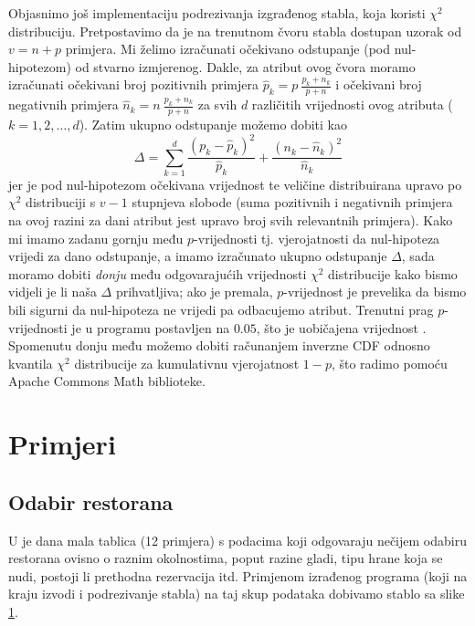 \documentclass[12pt,a4paper]{article}
\begin{document}
Objasnimo još implementaciju podrezivanja izgrađenog stabla, koja koristi $\chi^2$ distribuciju. Pretpostavimo da je na trenutnom
čvoru stabla dostupan uzorak od $v=n+p$ primjera. Mi želimo izračunati očekivano odstupanje (pod nul-hipotezom) od 
stvarno izmjerenog. Dakle, za atribut ovog čvora moramo izračunati očekivani broj pozitivnih primjera $\hat{p}_k=p\ \frac{p_k+n_k}{p+n}$
 i očekivani broj negativnih primjera $\hat{n}_k=n\ \frac{p_k+n_k}{p+n}$ za svih $d$ različitih vrijednosti ovog atributa ($k=1,2,\ldots,d$).
 Zatim ukupno odstupanje možemo dobiti kao
 \begin{equation*}
    \Delta=\sum^d_{k=1}\frac{(p_k-\hat{p}_k)^2}{\hat{p}_k}+\frac{(n_k-\hat{n}_k)^2}{\hat{n}_k}
 \end{equation*}
jer je pod nul-hipotezom očekivana vrijednost te veličine distribuirana upravo po $\chi^2$ distribuciji s $v-1$ stupnjeva slobode (suma pozitivnih
i negativnih primjera na ovoj razini za dani atribut jest upravo broj svih relevantnih primjera).
Kako mi imamo zadanu gornju među $p$-vrijednosti tj. vjerojatnosti da nul-hipoteza vrijedi za dano odstupanje, a imamo izračunato
ukupno odstupanje $\Delta$, sada moramo dobiti \emph{donju} među odgovarajućih vrijednosti $\chi^2$ distribucije kako bismo vidjeli je li 
naša $\Delta$ prihvatljiva; ako je premala, $p$-vrijednost je prevelika da bismo bili sigurni da nul-hipoteza ne vrijedi pa odbacujemo atribut.
Trenutni prag $p$-vrijednosti je u programu postavljen na $0.05$, što je uobičajena vrijednost \cite{rn}.
Spomenutu donju među možemo dobiti računanjem
inverzne CDF odnosno kvantila $\chi^2$ distribucije za kumulativnu vjerojatnost $1-p$, što radimo pomoću Apache Commons Math biblioteke.

\section{Primjeri}
\subsection{Odabir restorana}
U \cite{rn} je dana mala tablica (12 primjera) s podacima koji odgovaraju nečijem odabiru restorana ovisno o raznim okolnostima, poput 
razine gladi, tipu hrane koja se nudi, postoji li prethodna rezervacija itd. Primjenom izrađenog programa (koji na kraju 
izvodi i podrezivanje stabla) na taj skup podataka dobivamo stablo sa slike \ref{restaurants}.
\begin{figure} \label{restaurants}
    \end{figure}
\end{document}
